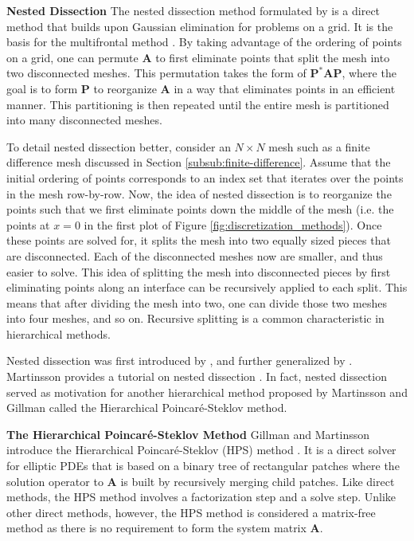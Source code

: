 
{\bf Nested Dissection}
The nested dissection method formulated by \cite{george1973nested} is a direct method that builds upon Gaussian elimination for problems on a grid. It is the basis for the multifrontal method \citep{liu1992multifrontal, davis2004algorithm}. By taking advantage of the ordering of points on a grid, one can permute $\textbf{A}$ to first eliminate points that split the mesh into two disconnected meshes. This permutation takes the form of $\textbf{P}^* \textbf{A} \textbf{P}$, where the goal is to form $\textbf{P}$ to reorganize $\textbf{A}$ in a way that eliminates points in an efficient manner. This partitioning is then repeated until the entire mesh is partitioned into many disconnected meshes.

To detail nested dissection better, consider an $N \times N$ mesh such as a finite difference mesh discussed in Section \ref{subsub:finite-difference}. Assume that the initial ordering of points corresponds to an index set that iterates over the points in the mesh row-by-row. Now, the idea of nested dissection is to reorganize the points such that we first eliminate points down the middle of the mesh (i.e. the points at $x = 0$ in the first plot of Figure \ref{fig:discretization_methods}). Once these points are solved for, it splits the mesh into two equally sized pieces that are disconnected. Each of the disconnected meshes now are smaller, and thus easier to solve. This idea of splitting the mesh into disconnected pieces by first eliminating points along an interface can be recursively applied to each split. This means that after dividing the mesh into two, one can divide those two meshes into four meshes, and so on. Recursive splitting is a common characteristic in hierarchical methods.

Nested dissection was first introduced by \cite{george1973nested}, and further generalized by \cite{lipton1979generalized}. Martinsson provides a tutorial on nested dissection \citep{martinsson2019fast}. In fact, nested dissection served as motivation for another hierarchical method proposed by Martinsson and Gillman called the Hierarchical Poincaré-Steklov method.


{\bf The Hierarchical Poincaré-Steklov Method}
Gillman and Martinsson introduce the Hierarchical Poincaré-Steklov (HPS) method \citep{martinsson2004fast, MARTINSSON2013460, gillman2014direct, martinsson2015hierarchical}. It is a direct solver for elliptic PDEs that is based on a binary tree of rectangular patches where the solution operator to $\textbf{A}$ is built by recursively merging child patches. Like direct methods, the HPS method involves a factorization step and a solve step. Unlike other direct methods, however, the HPS method is considered a matrix-free method as there is no requirement to form the system matrix $\textbf{A}$.


